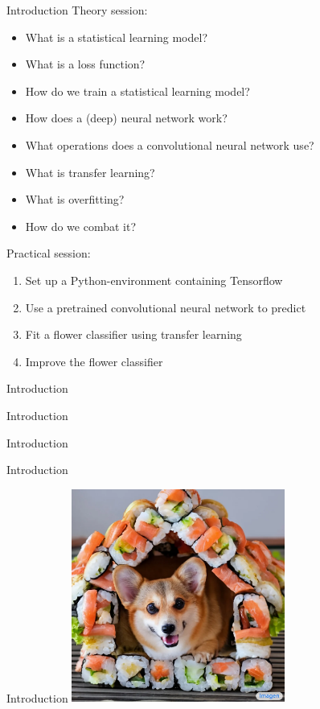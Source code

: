 \documentclass[8pt]{beamer}
\begin{document}
	\begin{frame}{Introduction} %
		\vfill
		Theory session:
		\begin{itemize}
			\item What is a statistical learning model?
			\item What is a loss function?
			\item How do we train a statistical learning model?
			\item How does a (deep) neural network work?
			\item What operations does a convolutional neural network use?
			\item What is transfer learning?
			\item What is overfitting?
			\item How do we combat it?
		\end{itemize}
		Practical session:
		\begin{enumerate}
			\item Set up a Python-environment containing Tensorflow
			\item Use a pretrained convolutional neural network to predict
			\item Fit a flower classifier using transfer learning
			\item Improve the flower classifier
		\end{enumerate}
		\vfill
	\end{frame}

	\begin{frame}{Introduction} %
	\end{frame}

	\begin{frame}{Introduction} %
	\end{frame}

	\begin{frame}{Introduction} %
	\end{frame}

	\begin{frame}{Introduction} %
	\end{frame}

	\begin{frame}{Introduction} %
		\centering
		\vfill
		\includegraphics[width=7cm]{data/dog-in-sushihouse.png}
		\vfill
	\end{frame}
\end{document}
